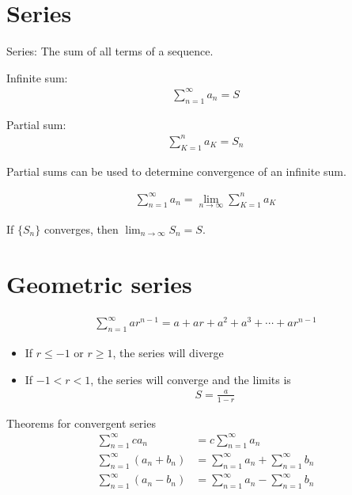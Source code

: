 \documentclass{article}
\begin{document}
\section{Series}

Series: The sum of all terms of a sequence.

Infinite sum:
\begin{gather*}
    \sum_{n=1}^{\infty} a_n = S
\end{gather*}

Partial sum:
\begin{gather*}
    \sum_{K=1}^{n} a_K = S_n
\end{gather*}

Partial sums can be used to determine convergence of an infinite sum.

\begin{gather*}
    \sum_{n=1}^{\infty} a_n = \lim_{n \to \infty} \sum_{K=1}^{n} a_K
\end{gather*}

If $\{S_n\}$ converges, then $\lim_{n \to \infty} S_n = S$.

\section{Geometric series}

\begin{gather*}
    \sum_{n=1}^{\infty} ar^{n-1} = a + ar + a^2 + a^3 + \cdots + ar^{n-1}
\end{gather*}

\begin{itemize}
    \item If $r \leq -1$ or $r \geq 1$, the series will diverge  \\
    \item If $-1 < r < 1$, the series will converge and the limits is \\
    \begin{gather*}
        S = \frac{a}{1-r}
    \end{gather*}
\end{itemize}

Theorems for convergent series
\begin{align*}
    \sum_{n=1}^{\infty} ca_n &= c \sum_{n=1}^{\infty} a_n \\
    \sum_{n=1}^{\infty} (a_n + b_n) &= \sum_{n=1}^{\infty} a_n + \sum_{n=1}^{\infty} b_n \\
    \sum_{n=1}^{\infty} (a_n - b_n) &= \sum_{n=1}^{\infty} a_n - \sum_{n=1}^{\infty} b_n
\end{align*}
\end{document}

